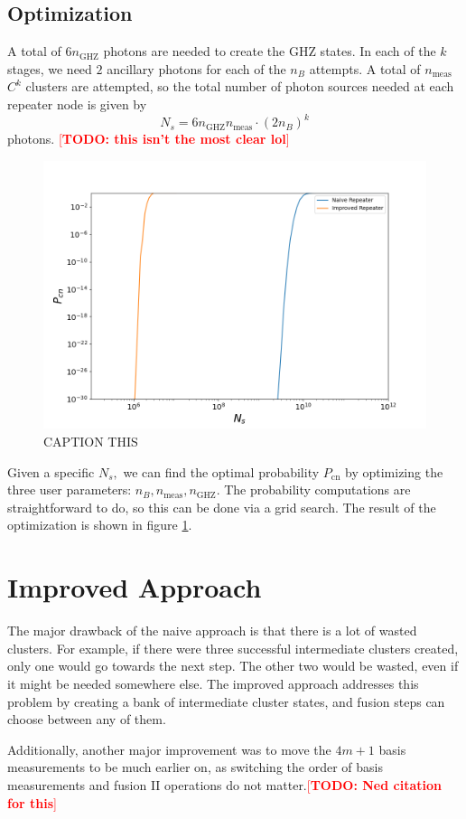 \documentclass[%
 reprint,
 amsmath,amssymb
 aps,
]{revtex4}
\theoremstyle{remark}
\begin{document}
\subsection{Optimization}
A total of $6n_\text{GHZ}$ photons are needed to create the GHZ states. In each of the $k$ stages, we need $2$ ancillary photons for each of the $n_B$ attempts. A total of $n_\text{meas}$ $C^k$ clusters are attempted, so the total number of photon sources needed at each repeater node is given by
$$ N_s = 6n_\text{GHZ}n_\text{meas} \cdot (2n_B)^k$$
photons. \textcolor{red}{[\textbf{TODO: this isn't the most clear lol}]}
\begin{figure}[h!]
    \centering
    \includegraphics[width=0.6\linewidth]{figs/p_graph.png} 
    \caption{CAPTION THIS}
    \label{fig:p_graph}
\end{figure}
Given a specific $N_s,$ we can find the optimal probability $P_\text{cn}$ by optimizing the three user parameters: $n_B,n_\text{meas},n_\text{GHZ}.$ The probability computations are straightforward to do, so this can be done via a grid search. The result of the optimization is shown in figure \ref{fig:p_graph}.
\section{Improved Approach}
The major drawback of the naive approach is that there is a lot of wasted clusters. For example, if there were three successful intermediate clusters created, only one would go towards the next step. The other two would be wasted, even if it might be needed somewhere else. The improved approach addresses this problem by creating a bank of intermediate cluster states, and fusion steps can choose between any of them.
\vspace{2mm}

Additionally, another major improvement was to move the $4m+1$ basis measurements to be much earlier on, as switching the order of basis measurements and fusion II operations do not matter.\textcolor{red}{[\textbf{TODO: Ned citation for this}]}
\vspace{2mm}
\end{document}
